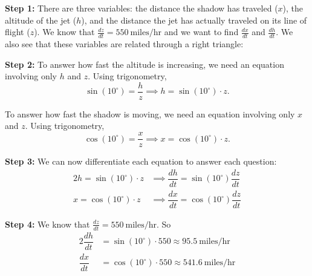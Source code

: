 \documentclass[cal1spr16Lectures.tex]{subfiles}
\begin{document}
\begin{frame}
\small
{\bf Step 1:}  There are three variables:  the distance the shadow has traveled ($x$), the altitude of the jet ($h$), and the distance the jet has actually traveled on its line of flight ($z$).  We know that $\textstyle\frac{dz}{dt}=550\ \text{miles/hr}$ and we want to find $\textstyle\frac{dx}{dt}$ and $\textstyle\frac{dh}{dt}$.  We also see that these variables are related through a right triangle:
\begin{center}
\end{center}
\end{frame}

\begin{frame}
\small
{\bf Step 2:}  To answer how fast the altitude is increasing, we need an equation involving only $h$ and $z$.  Using trigonometry,
\[\sin(10^{\circ})=\frac{h}{z} \implies h=\sin(10^{\circ}) \cdot z.\]

\vspace{1pc}
To answer how fast the shadow is moving, we need an equation involving only $x$ and $z$.  Using trigonometry,
\[\cos(10^{\circ})=\frac{x}{z} \implies x=\cos(10^{\circ}) \cdot z.\]
\end{frame}

\begin{frame}
\footnotesize
{\bf Step 3:}  We can now differentiate each equation to answer each question:
\begin{alignat*}{2}
h=\sin(10^{\circ}) \cdot z &\implies \dfrac{dh}{dt}=\sin(10^{\circ}) \dfrac{dz}{dt} \\
x=\cos(10^{\circ}) \cdot z &\implies \dfrac{dx}{dt}=\cos(10^{\circ}) \dfrac{dz}{dt}
\end{alignat*}

\vspace{1pc}
{\bf Step 4:}  We know that $\textstyle\frac{dz}{dt}=550\ \text{miles/hr}$.  So 
\begin{alignat*}{2}
\dfrac{dh}{dt} &=\sin(10^{\circ}) \cdot 550 \approx 95.5\ \text{miles/hr}\\
\dfrac{dx}{dt} &=\cos(10^{\circ}) \cdot 550 \approx 541.6\ \text{miles/hr}
\end{alignat*}
\end{frame}
\end{document}
